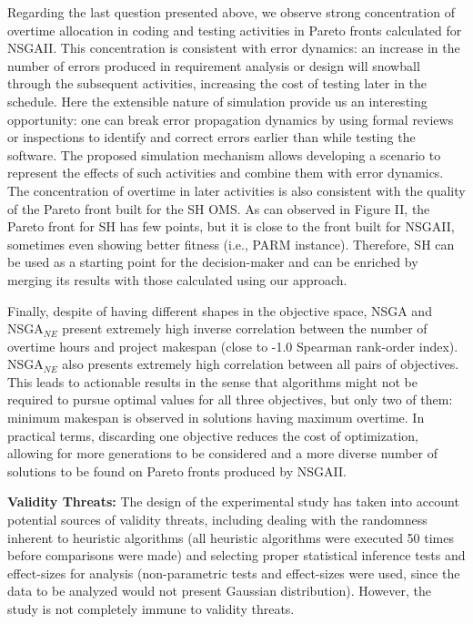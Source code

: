\documentclass[conference]{IEEEtran}
\begin{document}
Regarding the last question presented above, we observe strong concentration of overtime allocation in coding and testing activities in Pareto fronts calculated for NSGAII. This concentration is consistent with error dynamics: an increase in the number of errors produced in requirement analysis or design will snowball through the subsequent activities, increasing the cost of testing later in the schedule. Here the extensible nature of simulation provide us an interesting opportunity: one can break error propagation dynamics by using formal reviews or inspections to identify and correct errors earlier than while testing the software. The proposed simulation mechanism allows developing a scenario to represent the effects of such activities \cite{Madachy:1996} and combine them with error dynamics. The concentration of overtime in later activities is also consistent with the quality of the Pareto front built for the SH OMS. As can observed in Figure II, the Pareto front for SH has few points, but it is close to the front built for NSGAII, sometimes even showing better fitness (i.e., PARM instance). Therefore, SH can be used as a starting point for the decision-maker and can be enriched by merging its results with those calculated using our approach.

Finally, despite of having different shapes in the objective space, NSGA and NSGA$_{NE}$ present extremely high inverse correlation between the number of overtime hours and project makespan (close to -1.0 Spearman rank-order index). NSGA$_{NE}$ also presents extremely high correlation between all pairs of objectives. This leads to actionable results in the sense that algorithms might not be required to pursue optimal values for all three objectives, but only two of them: minimum makespan is observed in solutions having maximum overtime. In practical terms, discarding one objective reduces the cost of optimization, allowing for more generations to be considered and a more diverse number of solutions to be found on Pareto fronts produced by NSGAII.

\noindent
\textbf{Validity Threats:} The design of the experimental study has taken into account potential sources of validity threats, including dealing with the randomness inherent to heuristic algorithms (all heuristic algorithms were executed 50 times before comparisons were made) and selecting proper statistical inference tests and effect-sizes for analysis (non-parametric tests and effect-sizes were used, since the data to be analyzed would not present Gaussian distribution). However, the study is not completely immune to validity threats.
\end{document}
